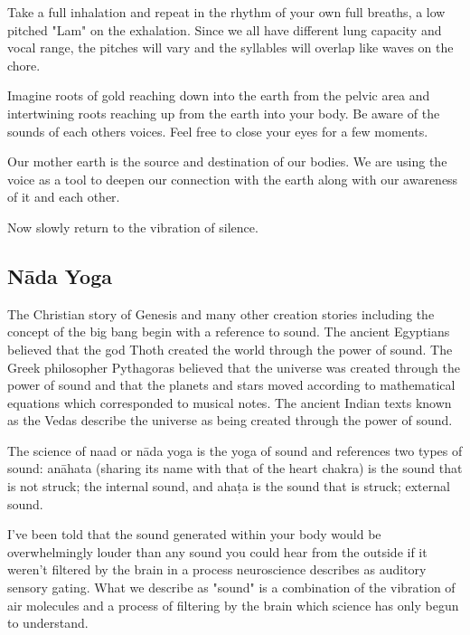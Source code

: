 \documentclass[12pt]{article}
\begin{document}
Take a full inhalation and repeat in the rhythm of your own full breaths, a low pitched "Lam" on the exhalation. Since we all have different lung capacity and vocal range, the pitches will vary and the syllables will overlap like waves on the chore.

Imagine roots of gold reaching down into the earth from the pelvic area and intertwining roots reaching up from the earth into your body. Be aware of the sounds of each others voices. Feel free to close your eyes for a few moments.

Our mother earth is the source and destination of our bodies. We are using the voice as a tool to deepen our connection with the earth along with our awareness of it and each other.

Now slowly return to the vibration of silence.

\subsection*{Nāda Yoga}

The Christian story of Genesis and many other creation stories including the concept of the big bang begin with a reference to sound. The ancient Egyptians believed that the god Thoth created the world through the power of sound. The Greek philosopher Pythagoras believed that the universe was created through the power of sound and that the planets and stars moved according to mathematical equations which corresponded to musical notes. The ancient Indian texts known as the Vedas describe the universe as being created through the power of sound.

The science of naad or nāda yoga is the yoga of sound and references two types of sound: anāhata (sharing its name with that of the heart chakra) is the sound that is not struck; the internal sound, and ahaṭa is the sound that is struck; external sound.



I've been told that the sound generated within your body would be overwhelmingly louder than any sound you could hear from the outside if it weren't filtered by the brain in a process neuroscience describes as auditory sensory gating. What we describe as "sound" is a combination of the vibration of air molecules and a process of filtering by the brain which science has only begun to understand.
\end{document}
